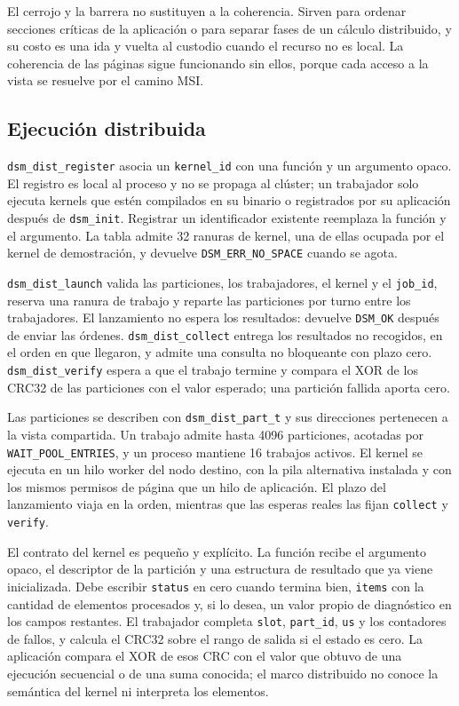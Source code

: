 El cerrojo y la barrera no sustituyen a la coherencia. Sirven para ordenar secciones críticas de la aplicación o para separar fases de un cálculo distribuido, y su costo es una ida y vuelta al custodio cuando el recurso no es local. La coherencia de las páginas sigue funcionando sin ellos, porque cada acceso a la vista se resuelve por el camino MSI.

\subsection{Ejecución distribuida}

\texttt{dsm\_dist\_register} asocia un \texttt{kernel\_id} con una función y un argumento opaco. El registro es local al proceso y no se propaga al clúster; un trabajador solo ejecuta kernels que estén compilados en su binario o registrados por su aplicación después de \texttt{dsm\_init}. Registrar un identificador existente reemplaza la función y el argumento. La tabla admite 32 ranuras de kernel, una de ellas ocupada por el kernel de demostración, y devuelve \texttt{DSM\_ERR\_NO\_SPACE} cuando se agota.

\texttt{dsm\_dist\_launch} valida las particiones, los trabajadores, el kernel y el \texttt{job\_id}, reserva una ranura de trabajo y reparte las particiones por turno entre los trabajadores. El lanzamiento no espera los resultados: devuelve \texttt{DSM\_OK} después de enviar las órdenes. \texttt{dsm\_dist\_collect} entrega los resultados no recogidos, en el orden en que llegaron, y admite una consulta no bloqueante con plazo cero. \texttt{dsm\_dist\_verify} espera a que el trabajo termine y compara el XOR de los CRC32 de las particiones con el valor esperado; una partición fallida aporta cero.

Las particiones se describen con \texttt{dsm\_dist\_part\_t} y sus direcciones pertenecen a la vista compartida. Un trabajo admite hasta 4096 particiones, acotadas por \texttt{WAIT\_POOL\_ENTRIES}, y un proceso mantiene 16 trabajos activos. El kernel se ejecuta en un hilo worker del nodo destino, con la pila alternativa instalada y con los mismos permisos de página que un hilo de aplicación. El plazo del lanzamiento viaja en la orden, mientras que las esperas reales las fijan \texttt{collect} y \texttt{verify}.

El contrato del kernel es pequeño y explícito. La función recibe el argumento opaco, el descriptor de la partición y una estructura de resultado que ya viene inicializada. Debe escribir \texttt{status} en cero cuando termina bien, \texttt{items} con la cantidad de elementos procesados y, si lo desea, un valor propio de diagnóstico en los campos restantes. El trabajador completa \texttt{slot}, \texttt{part\_id}, \texttt{us} y los contadores de fallos, y calcula el CRC32 sobre el rango de salida si el estado es cero. La aplicación compara el XOR de esos CRC con el valor que obtuvo de una ejecución secuencial o de una suma conocida; el marco distribuido no conoce la semántica del kernel ni interpreta los elementos.


